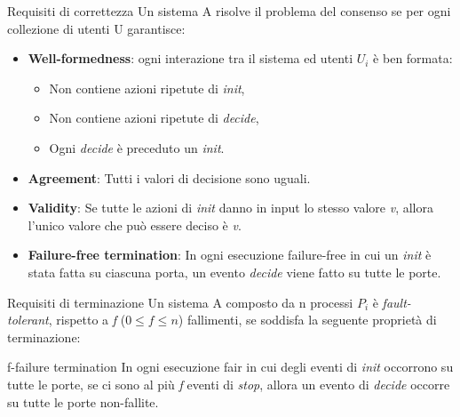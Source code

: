 \documentclass{beamer}
\begin{document}
\begin{frame}{Requisiti di correttezza}
    Un sistema A risolve il problema del consenso se per ogni collezione di utenti U garantisce:
    \begin{itemize}
        \item \textbf{Well-formedness}: ogni interazione tra il sistema ed utenti $U_{i}$ è ben formata:
        \begin{itemize}
            \item Non contiene azioni ripetute di \textit{init},
            \item Non contiene azioni ripetute di \textit{decide},
            \item Ogni \textit{decide} è preceduto un \textit{init}.
        \end{itemize}
        \item \textbf{Agreement}: Tutti i valori di decisione sono uguali.
        \item \textbf{Validity}: Se tutte le azioni di \textit{init} danno in input lo stesso valore \textit{v}, allora l'unico valore che può essere deciso è \textit{v}.
        \item \textbf{Failure-free termination}: In ogni esecuzione failure-free in cui un \textit{init} è stata fatta su ciascuna porta, un evento \textit{decide} viene fatto su tutte le porte.
    \end{itemize}
\end{frame}

\begin{frame}{Requisiti di terminazione}
    Un sistema A composto da n processi $P_{i}$ è \textit{fault-tolerant}, rispetto a \textit{f} ($0 \leq f \leq n$) fallimenti, se soddisfa la seguente proprietà di terminazione: 
    \begin{block}{f-failure termination}
    In ogni esecuzione fair in cui degli eventi di \textit{init} occorrono su tutte le porte, se ci sono al più \textit{f} eventi di \textit{stop}, allora un evento di \textit{decide} occorre su tutte le porte non-fallite. 
    \end{block}
\end{frame}
\end{document}
